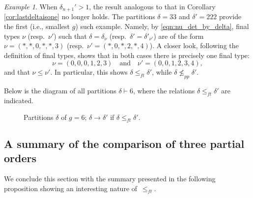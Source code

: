 \documentclass[11pt]{amsart}
\numberwithin{equation}{section}
\theoremstyle{plain}
\newcommand{\<}{\left \langle}
\renewcommand{\>}{\right \rangle}
\theoremstyle{definition}
\theoremstyle{remark}
\newtheorem{exmp}[thm]{Example}
\begin{document}
\begin{exmp}
\label{exmp:Example6}
When $\delta_{n+1}'>1$, the result analogous to that in Corollary \ref{cor:lastdeltaisone} no longer holds. The partitions $\delta = 33$ and $\delta' = 222$ provide the first (i.e., smallest $g$) such example. Namely, by \eqref{eqn:nu_det_by_delta}, final types $\nu$ (resp.~$\nu'$) such that $\delta = \delta_{\nu}$ (resp.~$\delta' = \delta'_{\nu'}$) are of the form $\nu = (*, *, 0, *, *, 3)$ (resp.~$\nu' = (*,0, *, 2, *, 4)$). A closer look, following the definition of final types, shows that in both cases there is precisely one final type: $$\nu = (0, 0, 0, 1, 2, 3)\quad \text{and}\quad \nu' = (0, 0, 1, 2, 3, 4),$$ and that $\nu \leq \nu'$.  
 In particular, this shows ${\delta}\leq_{ft} {\delta'}$, while ${\delta}\not\leq_{pp} {\delta'}$. 

 Below is the diagram of all partitions $\delta \vdash 6$, where the relations $\delta \leq_{ft} \delta'$ are indicated. 
  \begin{figure}[H]
 \begin{center}
\end{center}
     \caption{Partitions $\delta$ of $g = 6$; $\delta \rightarrow \delta'$ if ${\delta} \leq_{ft} {\delta'}$.}
     \label{fig:partitions_genus6}
 \end{figure}
\end{exmp}

\subsection{A summary of the comparison of three partial orders}

 We conclude this section with the summary presented in the following proposition showing an interesting nature of~$\leq_{ft}$. 
\end{document}
